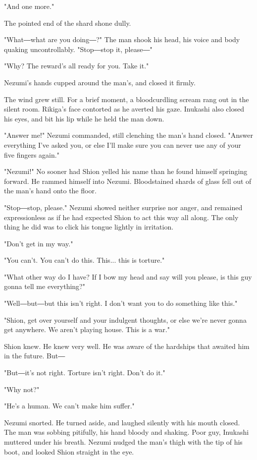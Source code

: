 "And one more."

The pointed end of the shard shone dully.

"What―what are you doing―?" The man shook his head, his voice and body
quaking uncontrollably. "Stop―stop it, please―"

"Why? The reward's all ready for you. Take it."

Nezumi's hands cupped around the man's, and closed it firmly.

The wind grew still. For a brief moment, a bloodcurdling scream rang out
in the silent room. Rikiga's face contorted as he averted his gaze.
Inukashi also closed his eyes, and bit his lip while he held the man
down.

"Answer me!" Nezumi commanded, still clenching the man's hand closed.
"Answer everything I've asked you, or else I'll make sure you can never
use any of your five fingers again."

"Nezumi!" No sooner had Shion yelled his name than he found himself
springing forward. He rammed himself into Nezumi. Bloodstained shards of
glass fell out of the man's hand onto the floor.

"Stop―stop, please." Nezumi showed neither surprise nor anger, and
remained expressionless as if he had expected Shion to act this way all
along. The only thing he did was to click his tongue lightly in
irritation.

"Don't get in my way."

"You can't. You can't do this. This... this is torture."

"What other way do I have? If I bow my head and say will you please, is
this guy gonna tell me everything?"

"Well―but―but this isn't right. I don't want you to do something like
this."

"Shion, get over yourself and your indulgent thoughts, or else we're
never gonna get anywhere. We aren't playing house. This is a war."

Shion knew. He knew very well. He was aware of the hardships that
awaited him in the future. But―

"But―it's not right. Torture isn't right. Don't do it."

"Why not?"

"He's a human. We can't make him suffer."

Nezumi snorted. He turned aside, and laughed silently with his mouth
closed. The man was sobbing pitifully, his hand bloody and shaking. Poor
guy, Inukashi muttered under his breath. Nezumi nudged the man's thigh
with the tip of his boot, and looked Shion straight in the eye.

